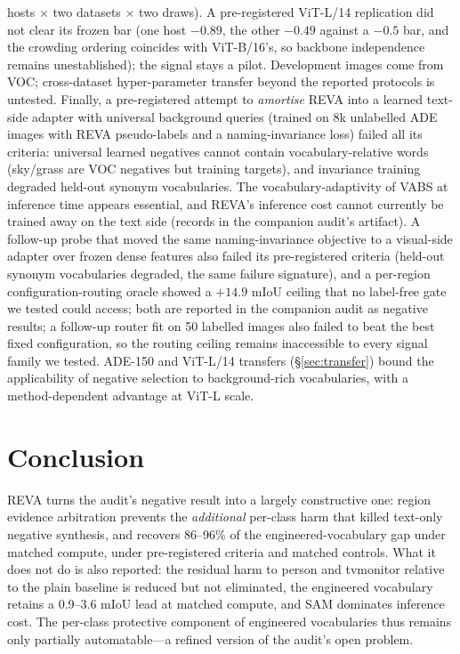 \documentclass[11pt]{article}
\newcommand{\miou}{mIoU}
\newcommand{\reva}{REVA}
\begin{document}
hosts $\times$ two datasets $\times$ two draws). A
pre-registered ViT-L/14 replication did not clear its frozen bar
(one host $-0.89$, the other $-0.49$ against a $-0.5$ bar, and the
crowding ordering coincides with ViT-B/16's, so backbone independence
remains unestablished); the signal stays a pilot. Development images come from VOC; cross-dataset hyper-parameter
transfer beyond the reported protocols is untested. Finally, a pre-registered
attempt to \emph{amortise} \reva{} into a learned text-side adapter with universal
background queries (trained on 8k unlabelled ADE images with \reva{} pseudo-labels
and a naming-invariance loss) failed all its criteria: universal learned negatives
cannot contain vocabulary-relative words (sky/grass are VOC negatives but training
targets), and invariance training degraded held-out synonym vocabularies. The
vocabulary-adaptivity of VABS at inference time appears essential, and \reva{}'s
inference cost cannot currently be trained away on the text side (records in the
companion audit's artifact). A follow-up probe that moved the same
naming-invariance objective to a visual-side adapter over frozen dense features
also failed its pre-registered criteria (held-out synonym vocabularies degraded,
the same failure signature), and a per-region configuration-routing oracle showed
a $+14.9$ \miou{} ceiling that no label-free gate we tested could access; both are
reported in the companion audit as negative results; a follow-up router fit on 50
labelled images also failed to beat the best fixed configuration, so the routing
ceiling remains inaccessible to every signal family we tested. ADE-150 and ViT-L/14
transfers (\S\ref{sec:transfer}) bound the applicability of negative selection to
background-rich vocabularies, with a method-dependent advantage at ViT-L scale.

\section{Conclusion}
\reva{} turns the audit's negative result into a largely constructive one: region
evidence arbitration prevents the \emph{additional} per-class harm that killed
text-only negative synthesis, and recovers 86--96\% of the engineered-vocabulary gap
under matched compute, under pre-registered criteria and matched controls. What it
does not do is also reported: the residual harm to person and tvmonitor relative to
the plain baseline is reduced but not eliminated, the engineered vocabulary retains a
0.9--3.6 \miou{} lead at matched compute, and SAM dominates inference cost. The
per-class protective component of engineered vocabularies thus remains only
partially automatable---a refined version of the audit's open problem.
\end{document}

